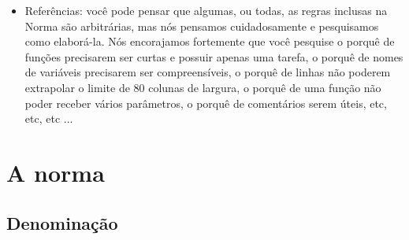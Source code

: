 \documentclass{42-pt}
\begin{document}
\begin{itemize}
    \item Referências: você pode pensar que algumas, ou todas, as regras
      inclusas na Norma são arbitrárias, mas nós pensamos cuidadosamente e
      pesquisamos como elaborá-la. Nós encorajamos fortemente que você
      pesquise o porquê de funções precisarem ser curtas e possuir apenas
      uma tarefa, o porquê de nomes de variáveis precisarem ser
      compreensíveis, o porquê de linhas não poderem extrapolar o limite
      de 80 colunas de largura, o porquê de uma função não poder receber
      vários parâmetros, o porquê de comentários serem úteis, etc, etc,
      etc ...


    \end{itemize}


\newpage

\chapter{A norma}


    \section{Denominação}
\end{document}
